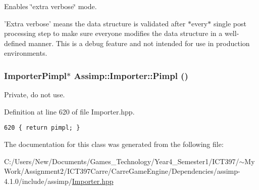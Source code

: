 Enables \char`\"{}extra verbose\char`\"{} mode.

'Extra verbose' means the data structure is validated after $\ast$every$\ast$ single post processing step to make sure everyone modifies the data structure in a well-defined manner. This is a debug feature and not intended for use in production environments. \hypertarget{class_assimp_1_1_importer_c112839f323a630f83395acb74746827}{
\subsubsection[Pimpl]{\setlength{\rightskip}{0pt plus 5cm}ImporterPimpl$\ast$ Assimp::Importer::Pimpl ()}}
\label{class_assimp_1_1_importer_c112839f323a630f83395acb74746827}


Private, do not use. 

Definition at line 620 of file Importer.hpp.

\begin{Code}\begin{verbatim}620 { return pimpl; }
\end{verbatim}
\end{Code}




The documentation for this class was generated from the following file:\begin{CompactItemize}
\item 
C:/Users/New/Documents/Games\_\-Technology/Year4\_\-Semester1/ICT397/$\sim$My Work/Assignment2/ICT397Carre/CarreGameEngine/Dependencies/assimp-4.1.0/include/assimp/\hyperlink{_importer_8hpp}{Importer.hpp}\end{CompactItemize}

